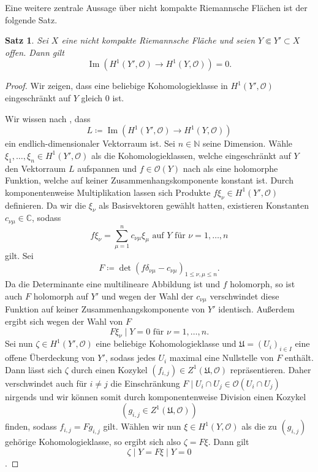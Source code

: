 \documentclass[11pt,a4paper,toc=bibliography]{scrartcl}
\theoremstyle{thm}
\newtheorem{satz}{Satz}[section]
\theoremstyle{def}
\theoremstyle{remark}
\DeclareMathOperator{\Ima}{Im}
\begin{document}
Eine weitere zentrale Aussage über nicht kompakte Riemannsche Flächen ist der folgende Satz.
\begin{satz}
Sei $X$ eine nicht kompakte Riemannsche Fläche und seien $Y\Subset Y'\subset X$ offen. Dann gilt
\[
\Ima \left(H^1(Y',\mathcal{O})\rightarrow H^1(Y,\mathcal{O})\right) = 0.
\]
\end{satz}
\begin{proof}
	Wir zeigen, dass eine beliebige Kohomologieklasse in $H^1(Y',\mathcal{O})$ eingeschränkt auf $Y$ gleich $0$ ist.
	
	Wir wissen nach , dass 
	\[L\coloneqq \Ima\left(H^1(Y',\mathcal{O})\rightarrow H^1(Y,\mathcal{O})\right)\]
	ein endlich-dimensionaler Vektorraum ist. Sei $n\in\mathbb{N}$ seine Dimension. Wähle $\xi_1,\ldots,\xi_n\in H^1(Y',\mathcal{O})$ als die Kohomologieklassen, welche eingeschränkt auf $Y$ den Vektorraum $L$ aufspannen und $f\in\mathcal{O}(Y)$ nach  als eine holomorphe Funktion, welche auf keiner Zusammenhangskomponente konstant ist. Durch komponentenweise Multiplikation lassen sich Produkte $f\xi_\nu\in H^1(Y',\mathcal{O})$ definieren. Da wir die $\xi_\nu$ als Basisvektoren gewählt hatten, existieren Konstanten $c_{\nu\mu}\in\mathbb{C}$, sodass
	\[f\xi_\nu =\sum_{\mu=1}^n c_{\nu\mu}\xi_\mu \text{ auf } Y\text{ für } \nu=1,\ldots,n\]
	gilt. Sei
	\[
	F\coloneqq \det (f\delta_{\nu\mu}-c_{\nu\mu})_{1\leq\nu,\mu\leq n}.
	\]
	Da die Determinante eine multilineare Abbildung ist und $f$ holomorph, so ist auch $F$ holomorph auf $Y'$ und wegen der Wahl der $c_{\nu\mu}$ verschwindet diese Funktion auf keiner Zusammenhangskomponente von $Y'$ identisch. Außerdem ergibt sich wegen der Wahl von $F$
	\[
	F\xi_\nu\mid Y = 0\text{ für } \nu=1,\ldots,n.
	\]
	Sei nun $\zeta\in H^1(Y',\mathcal{O})$ eine beliebige Kohomologieklasse und $\mathfrak{U}=(U_i)_{i\in I}$ eine offene Überdeckung von $Y'$, sodass jedes $U_i$ maximal eine Nullstelle von $F$ enthält. Dann lässt sich $\zeta$ durch einen Kozykel $(f_{i,j})\in Z^1(\mathfrak{U},\mathcal{O})$ repräsentieren.
	Daher verschwindet auch für $i\neq j$ die Einschränkung $F\mid U_i\cap U_j\in \mathcal{O}(U_i\cap U_j)$ nirgends und wir können somit durch komponentenweise Division einen Kozykel 
	\[(g_{i,j}\in Z^1(\mathfrak{U},\mathcal{O}))\]
	finden,
	sodass $f_{i,j}=Fg_{i,j}$ gilt. 
	Wählen wir nun $\xi\in H^1(Y,\mathcal{O})$ als die zu $(g_{i,j})$ gehörige Kohomologieklasse, so ergibt sich also $\zeta =F\xi$. Dann gilt
	\[\zeta\mid Y = F\xi\mid Y =0\].
	\end{proof}
\end{document}
